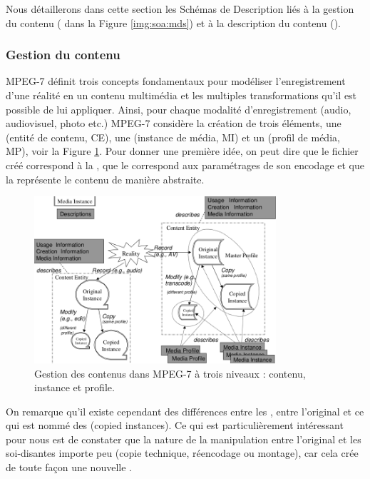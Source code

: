 Nous détaillerons dans cette section les Schémas de Description liés à la gestion du contenu ( dans la Figure \ref{img:soa:mds}) et à la description du contenu ().\\


\subsubsection{Gestion du contenu}
MPEG-7 définit trois concepts fondamentaux pour modéliser l'enregistrement d'une réalité en un contenu multimédia et les multiples transformations qu'il est possible de lui appliquer. 
Ainsi, pour chaque modalité d'enregistrement (audio, audiovisuel, photo etc.) MPEG-7 considère la création de trois éléments, une  (entité de contenu, CE), une  (instance de média, MI) et un  (profil de média, MP), voir la Figure \ref{img:soa:media}.
Pour donner une première idée, on peut dire que le fichier créé correspond à la , que le  correspond aux paramétrages de son encodage et que la  représente le contenu de manière abstraite.

\begin{figure}[ht!]
\centering
\includegraphics[width=0.8\textwidth]{images/MPEG-7-MediaManagement.png}
\caption{Gestion des contenus dans MPEG-7 à trois niveaux : contenu, instance et profile.}
\label{img:soa:media}
\end{figure}


On remarque qu'il existe cependant des différences entre les , entre l'original et ce qui est nommé des  (copied instances). 
Ce qui est particulièrement intéressant pour nous est de constater que la nature de la manipulation entre l'original et les soi-disantes  importe peu (copie technique, réencodage ou montage), car cela crée de toute façon une nouvelle . 

